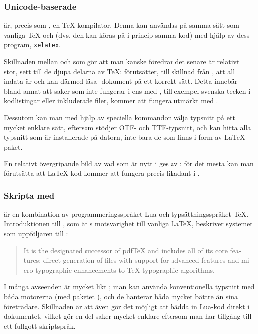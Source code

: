 \documentclass[../../latex.tex]{subfiles}
\begin{document}
\subsubsection{Unicode-baserade \XeTeX}
\XeTeX är, precis som \pdfLaTeX, en \TeX-kompilator. Denna kan användas
på samma sätt som vanliga \TeX{} och \pdfLaTeX (dvs. den kan köras på i
princip samma kod) med hjälp av dess program, \texttt{xelatex}.

Skillnaden mellan \pdfLaTeX{} och \XeTeX som gör att man kanske föredrar
det senare är relativt stor, sett till de djupa delarna av \TeX: \XeTeX 
förutsätter, till skillnad från \pdfLaTeX, att all indata är \UTF och kan
därmed läsa \UTF-dokument på ett korrekt sätt. Detta innebär bland annat
att saker som inte fungerar i \pdfLaTeX ens med , till
exempel svenska tecken i kodlistingar eller inkluderade filer, kommer att
fungera utmärkt med \XeTeX.

Dessutom kan man med hjälp av speciella kommandon välja typsnitt på ett
mycket enklare sätt, eftersom \XeTeX stödjer \textsc{OTF}- och
\textsc{TTF}-typsnitt, och kan hitta alla typsnitt som är installerade
på datorn, inte bara de som finns i form av \LaTeX-paket.

En relativt övergripande bild av vad som är nytt i \XeTeX ges av
; för det mesta kan man förutsätta att \LaTeX-kod
kommer att fungera precis likadant i \XeTeX.

\subsubsection{Skripta med }
 är en kombination av programmeringsspråket Lua och
typsättningsspråket \TeX. Introduktionen till ,
som är s motsvarighet till vanliga \LaTeX,
beskriver systemet som uppföljaren till \pdfLaTeX:
\begin{quote}
	\begin{english}
		It is the designated successor of pdf\TeX{} and includes all of 
		its core features: direct generation of \PDF files with support 
		for advanced \PDF features and micro-typographic enhancements to 
		\TeX{} typographic algorithms.
		
		\hfill\cite{Gonnard10}\hspace{-1ex}%
	\end{english}
\end{quote}

I många avseenden är  mycket likt \XeTeX; man kan använda
konventionella typsnitt med båda motorerna (med paketet ), 
och de hanterar båda \UTF 
mycket bättre än sina företrädare. Skillnaden är att 
även gör det möjligt att bädda in Lua-kod direkt i dokumentet, vilket gör
en del saker mycket enklare eftersom man har tillgång till ett fullgott
skriptspråk.
\end{document}
